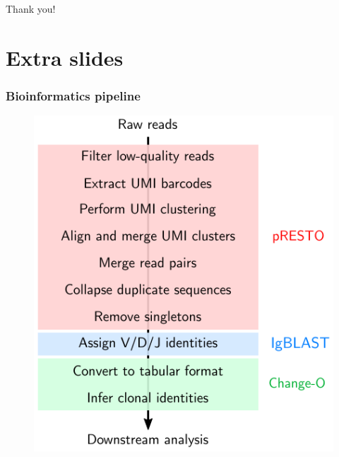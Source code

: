 \documentclass[presentation]{beamer}
\newlength{\slideheight}
\begin{document}
\section{}
\begin{frame}\begin{center}
\Huge Thank you!
\end{center}\end{frame}




\appendix
\blackslide
\section*{Extra slides}



\begin{frame}
\frametitle{Bioinformatics pipeline}
\begin{figure}
\includegraphics[height=\slideheight]{figs/pdf/immcantation-pipeline}
\end{figure}
\end{frame}
\end{document}
